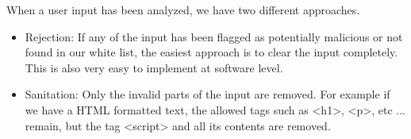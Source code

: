 When a user input has been analyzed, we have two different approaches.

\begin{itemize}
\item Rejection: If any of the input has been flagged as potentially malicious or not found in our white list, the easiest approach is to clear the input completely. This is also very easy to implement at software level. 

\item Sanitation: Only the invalid parts of the input are removed. For example if we have a HTML formatted text, the allowed tags such as <h1>, <p>, etc ...  remain, but the tag <script> and all its contents are removed.
\end{itemize}